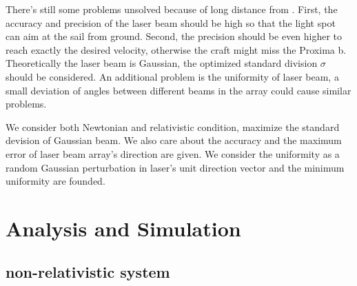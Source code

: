 \documentclass{article}
\begin{document}
There's still some problems unsolved because of long distance from . First, the accuracy and precision of the laser beam should be high so that the light spot can aim at the sail from ground. Second, the precision should be even higher to reach exactly the desired velocity, otherwise the craft might miss the Proxima b. Theoretically the laser beam is Gaussian, the optimized standard division $\sigma$ should be considered. An additional problem is the uniformity of laser beam, a small deviation of angles between different beams in the array could cause similar problems.

We consider both Newtonian and relativistic condition, maximize the standard devision of Gaussian beam. We also care about the accuracy and the maximum error of laser beam array's direction are given. We consider the uniformity as a random Gaussian perturbation in laser's unit direction vector and the minimum uniformity are founded.

\section{Analysis and Simulation}
\subsection{non-relativistic system}
\end{document}
